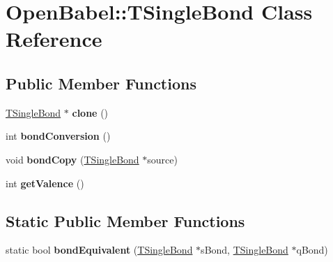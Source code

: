 \hypertarget{class_open_babel_1_1_t_single_bond}{\section{Open\-Babel\-:\-:T\-Single\-Bond Class Reference}
\label{class_open_babel_1_1_t_single_bond}
}
\subsection*{Public Member Functions}
\begin{DoxyCompactItemize}
\item 
\hypertarget{class_open_babel_1_1_t_single_bond_a2b195bbad3b9ab1249f0d507c5a47a7a}{\hyperlink{class_open_babel_1_1_t_single_bond}{T\-Single\-Bond} $\ast$ {\bfseries clone} ()}\label{class_open_babel_1_1_t_single_bond_a2b195bbad3b9ab1249f0d507c5a47a7a}

\item 
\hypertarget{class_open_babel_1_1_t_single_bond_a03d7d0f6a7a7f9b0b2aa66eac57e41df}{int {\bfseries bond\-Conversion} ()}\label{class_open_babel_1_1_t_single_bond_a03d7d0f6a7a7f9b0b2aa66eac57e41df}

\item 
\hypertarget{class_open_babel_1_1_t_single_bond_aeda6f5409695d98ea04a08ded1fe6730}{void {\bfseries bond\-Copy} (\hyperlink{class_open_babel_1_1_t_single_bond}{T\-Single\-Bond} $\ast$source)}\label{class_open_babel_1_1_t_single_bond_aeda6f5409695d98ea04a08ded1fe6730}

\item 
\hypertarget{class_open_babel_1_1_t_single_bond_a22bcc8362eab81396f3a59e8b65c842b}{int {\bfseries get\-Valence} ()}\label{class_open_babel_1_1_t_single_bond_a22bcc8362eab81396f3a59e8b65c842b}

\end{DoxyCompactItemize}
\subsection*{Static Public Member Functions}
\begin{DoxyCompactItemize}
\item 
\hypertarget{class_open_babel_1_1_t_single_bond_a3a9ecb25c5f536d16eac24e92e50798b}{static bool {\bfseries bond\-Equivalent} (\hyperlink{class_open_babel_1_1_t_single_bond}{T\-Single\-Bond} $\ast$s\-Bond, \hyperlink{class_open_babel_1_1_t_single_bond}{T\-Single\-Bond} $\ast$q\-Bond)}\label{class_open_babel_1_1_t_single_bond_a3a9ecb25c5f536d16eac24e92e50798b}

\end{DoxyCompactItemize}
